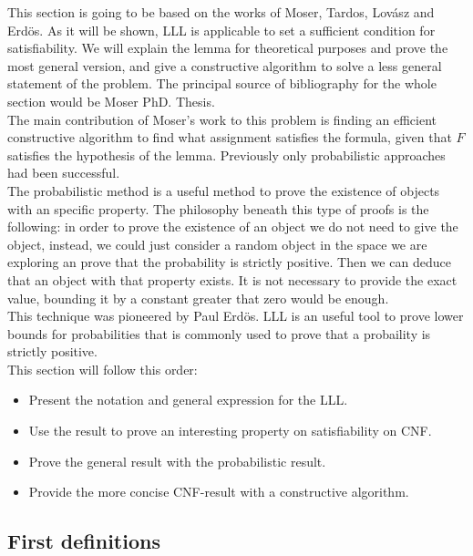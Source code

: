 
 
This section is going to be based on the works of Moser, Tardos, Lovász and Erdös. As it will be shown, LLL is applicable to set a sufficient condition for satisfiability.  We will explain the lemma for theoretical purposes and prove the most general version, and give a constructive algorithm to solve a less general statement of the problem. The principal source of bibliography for the whole section would be Moser PhD. Thesis\cite{moser2009constructive}. \\ 



The main contribution of Moser's work to this problem is finding an efficient constructive algorithm to find what assignment satisfies the formula, given that $F$ satisfies the hypothesis of the lemma. Previously only probabilistic approaches had been successful.\\


The probabilistic method is a useful method to prove the existence of objects with an specific property. The philosophy beneath this type of proofs is the following: in order to prove the existence of an object we do not need to give the object, instead, we could just consider a random object in the space we are exploring an prove that the probability is strictly positive. Then we can deduce that an object with that property exists. It is not necessary to provide the exact value, bounding it by a constant greater that zero would be enough. \\

This technique was pioneered by Paul Erdös. LLL is an useful tool to prove lower bounds for probabilities that is commonly used to prove that a probaility is strictly positive.\\

This section will follow this order:
\begin{itemize}
	\item Present the notation and general expression for the LLL.
	\item Use the result to prove an interesting property on satisfiability on CNF.
	\item Prove the general result with the probabilistic result.
	\item Provide the more concise CNF-result with a constructive algorithm.
\end{itemize}


\subsection{First definitions}

